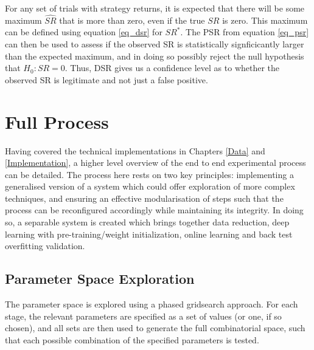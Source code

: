 \documentclass[a4paper,11pt,oneside]{article}
\theoremstyle{plain}
\theoremstyle{definition}
\begin{document}
	For any set of trials with strategy returns, it is expected that there will be some maximum $\widehat{SR}$ that is more than zero, even if the true $SR$ is zero. This maximum can be defined using equation \ref{eq_dsr} for $SR^*$. The PSR from equation \ref{eq_psr} can then be used to assess if the observed SR is statistically signficicantly larger than the expected maximum, and in doing so possibly reject the null hypothesis that $H_0: SR = 0$. Thus, DSR gives us a confidence level as to whether the observed SR is legitimate and not just a false positive.
	
	
	
	

		
		
		
		
		
		
		
		
		
		
		
		
		
	\newpage
	\section{Full Process}\label{imp_proc}
	
	Having covered the technical implementations in Chapters \ref{Data} and \ref{Implementation}, a higher level overview of the end to end experimental process can be detailed. The process here rests on two key principles: implementing a generalised version of a system which could offer exploration of more complex techniques, and ensuring an effective modularisation of steps such that the process can be reconfigured accordingly while maintaining its integrity. In doing so, a separable system is created which brings together data reduction, deep learning with pre-training/weight initialization, online learning and back test overfitting validation.
	
	\subsection{Parameter Space Exploration}\label{proc_parameters}
	
	The parameter space is explored using a phased gridsearch approach. For each stage, the relevant parameters are specified as a set of values (or one, if so chosen), and all sets are then used to generate the full combinatorial space, such that each possible combination of the specified parameters is tested.
	
\end{document}
